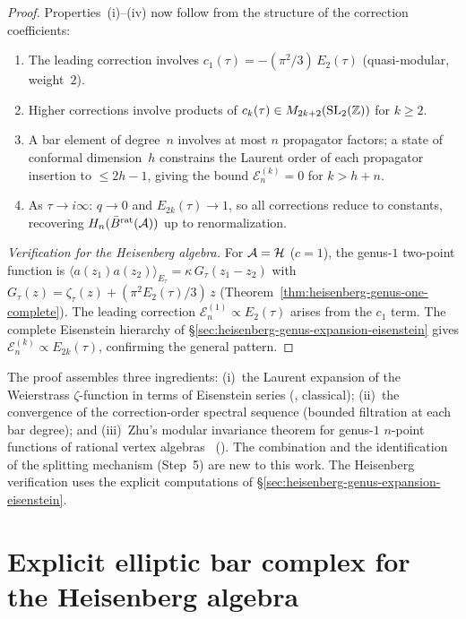\begin{proof}
Properties~(i)--(iv) now follow from the structure of the correction
coefficients:
\begin{enumerate}[label=(\roman*)]
\item The leading correction involves $c_1(\tau) = -(\pi^2/3)\,E_2(\tau)$
(quasi-modular, weight~$2$).
\item Higher corrections involve products of
$c_k(\tau) \in M_{2k+2}(\mathrm{SL}_2(\mathbb{Z}))$ for $k \geq 2$.
\item A bar element of degree~$n$ involves at most $n$ propagator
factors; a state of conformal dimension~$h$ constrains the Laurent
order of each propagator insertion to $\leq 2h - 1$, giving the bound
$\mathcal{E}^{(k)}_n = 0$ for $k > h + n$.
\item As $\tau \to i\infty$: $q \to 0$ and $E_{2k}(\tau) \to 1$, so all
corrections reduce to constants, recovering $H_n(\bar{B}^{\mathrm{rat}}(\mathcal{A}))$
up to renormalization.
\end{enumerate}

\emph{Verification for the Heisenberg algebra.}
For $\mathcal{A} = \mathcal{H}$ ($c = 1$), the genus-$1$ two-point function is
$\langle a(z_1)a(z_2)\rangle_{E_\tau} = \kappa\,G_\tau(z_1 - z_2)$
with $G_\tau(z) = \zeta_\tau(z) + (\pi^2 E_2(\tau)/3)\,z$
(Theorem~\ref{thm:heisenberg-genus-one-complete}).  The leading
correction $\mathcal{E}^{(1)}_n \propto E_2(\tau)$ arises from the
$c_1$ term.  The complete Eisenstein hierarchy of
\S\ref{sec:heisenberg-genus-expansion-eisenstein} gives
$\mathcal{E}^{(k)}_n \propto E_{2k}(\tau)$, confirming the general
pattern.
\end{proof}

\begin{remark}[Scope]
The proof assembles three ingredients:
(i)~the Laurent expansion of the Weierstrass $\zeta$-function in
terms of Eisenstein series (\ClaimStatusProvedElsewhere, classical);
(ii)~the convergence of the correction-order spectral sequence
(bounded filtration at each bar degree); and
(iii)~Zhu's modular invariance theorem for genus-$1$ $n$-point
functions of rational vertex algebras~\cite{Zhu96}
(\ClaimStatusProvedElsewhere).  The combination and the identification
of the splitting mechanism (Step~5) are new to this work.
The Heisenberg verification uses the explicit computations of
\S\ref{sec:heisenberg-genus-expansion-eisenstein}.
\end{remark}



\section{Explicit elliptic bar complex for the Heisenberg algebra}
\label{sec:elliptic-bar-heisenberg}

